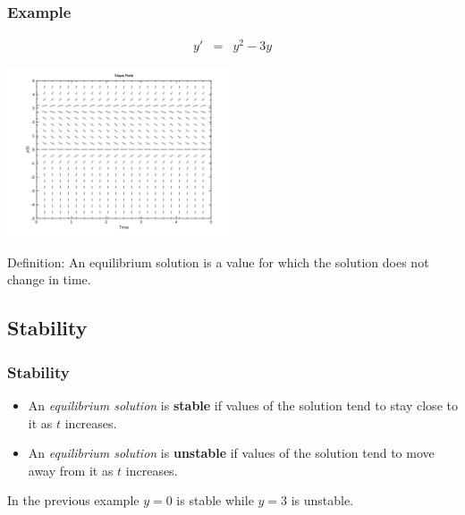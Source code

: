 \begin{frame}
  \frametitle{Example}

  \vspace*{-4em}

  \begin{eqnarray*}
    y' & = & y^2 - 3y
  \end{eqnarray*}

  \includegraphics[height=5cm]{img/week1Day2SlopeField3}

  Definition: An equilibrium solution is a value for which the
  solution does not change in time.


\end{frame}

\subsection{Stability}

\begin{frame}
  \frametitle{Stability}

  \begin{itemize}
  \item An \textit{equilibrium solution} is \textbf{stable} if values
    of the solution tend to stay close to it as $t$ increases.
  \item An \textit{equilibrium solution} is \textbf{unstable} if
    values of the solution tend to move away from it as $t$ increases.
  \end{itemize}

  In the previous example $y=0$ is stable while $y=3$ is unstable.

\end{frame}



